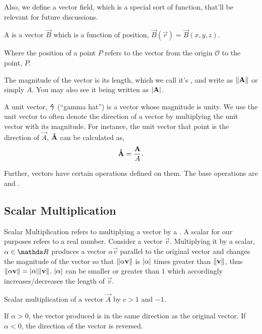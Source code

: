 Also, we define a vector field, which is a special sort of function, that'll be relevant 
for future discussions.

\begin{definition}
  A  is a vector \(\vec{B}\) which is a function of position, \(\vec{B}(\vec{r}) = \vec{B}(x, y, z)\). 
\end{definition}

Where the position of a point \(P\) refers to the vector from the origin \(\mathcal{O}\) to the point, \(P\).

The magnitude of the vector is its length, which we call it's , and write
as \(\norm{\mathbf{\boldsymbol{A}}}\) or simply \(A\). You may also see it being written as \(\abs{\mathbf{\boldsymbol{A}}}\).

A unit vector, \(\mathbf{\boldsymbol{\hat{\gamma}}}\) (“gamma hat”) is a vector whose magnitude is unity. We use the unit vector to
often denote the direction of a vector by multiplying the unit vector with its magnitude.
For instance, the unit vector that point is the direction of \(\vec{A}\), \(\mathbf{\boldsymbol{\hat{A}}}\) can be calculated as,
\[
\mathbf{\boldsymbol{\hat{A}}} = \frac{\mathbf{\boldsymbol{A}}}{A}.
\]

Further, vectors have certain operations defined on them. The base operations
are  and .

\subsection{Scalar Multiplication}  

Scalar Multiplication refers to multiplying a vector by a . A scalar
for our purposes refers to a real number. Consider a vector \(\vec{v}\).
Multiplying it by a scalar, \(\alpha \in \RR\) produces a vector 
\(\alpha\vec{v}\) parallel to the original vector and changes the magnitude of the vector so that
\(\norm{\alpha\mathbf{\boldsymbol{v}}}\) is \(\abs{\alpha}\) times greater than \(\norm{\mathbf{\boldsymbol{v}}}\), thus
\(\norm{\alpha \mathbf{\boldsymbol{v}}} = \abs{\alpha}\norm{\mathbf{\boldsymbol{v}}}\). \(\abs{\alpha}\) can 
be smaller or greater than \(1\) which accordingly increases/decreases the 
length of \(\vec{v}\).

\begin{marginfigure}
  \centering
  \caption{Scalar multiplication of a vector \(\vec{A}\) by \(c > 1\) and \(-1\).}
\end{marginfigure}

If \(\alpha > 0\), the vector produced is in the same direction as the original vector. If
\(\alpha < 0\), the direction of the vector is reversed. 

